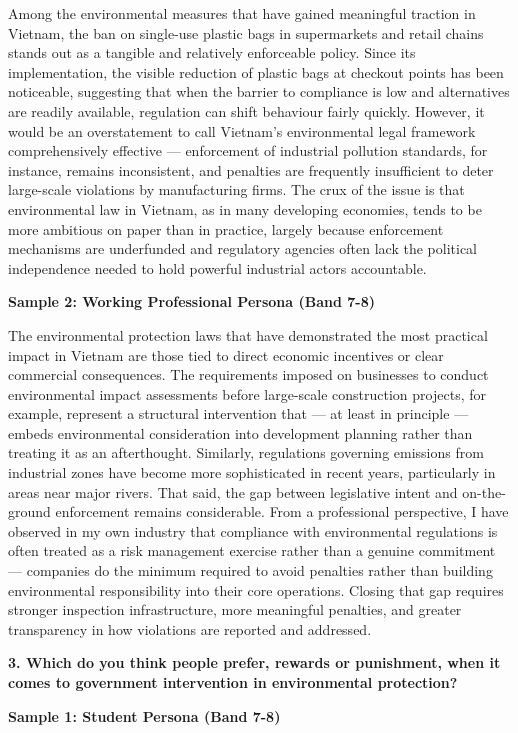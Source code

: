 Among the environmental measures that have gained meaningful traction in Vietnam, the ban on single-use plastic bags in supermarkets and retail chains stands out as a tangible and relatively enforceable policy. Since its implementation, the visible reduction of plastic bags at checkout points has been noticeable, suggesting that when the barrier to compliance is low and alternatives are readily available, regulation can shift behaviour fairly quickly. However, it would be an overstatement to call Vietnam's environmental legal framework comprehensively effective — enforcement of industrial pollution standards, for instance, remains inconsistent, and penalties are frequently insufficient to deter large-scale violations by manufacturing firms. The crux of the issue is that environmental law in Vietnam, as in many developing economies, tends to be more ambitious on paper than in practice, largely because enforcement mechanisms are underfunded and regulatory agencies often lack the political independence needed to hold powerful industrial actors accountable.

\textbf{Sample 2: Working Professional Persona (Band 7-8)}

The environmental protection laws that have demonstrated the most practical impact in Vietnam are those tied to direct economic incentives or clear commercial consequences. The requirements imposed on businesses to conduct environmental impact assessments before large-scale construction projects, for example, represent a structural intervention that — at least in principle — embeds environmental consideration into development planning rather than treating it as an afterthought. Similarly, regulations governing emissions from industrial zones have become more sophisticated in recent years, particularly in areas near major rivers. That said, the gap between legislative intent and on-the-ground enforcement remains considerable. From a professional perspective, I have observed in my own industry that compliance with environmental regulations is often treated as a risk management exercise rather than a genuine commitment — companies do the minimum required to avoid penalties rather than building environmental responsibility into their core operations. Closing that gap requires stronger inspection infrastructure, more meaningful penalties, and greater transparency in how violations are reported and addressed.

\separator

\begin{ieltsquestion}
\textbf{3. Which do you think people prefer, rewards or punishment, when it comes to government intervention in environmental protection?}
\end{ieltsquestion}
\textbf{Sample 1: Student Persona (Band 7-8)}

